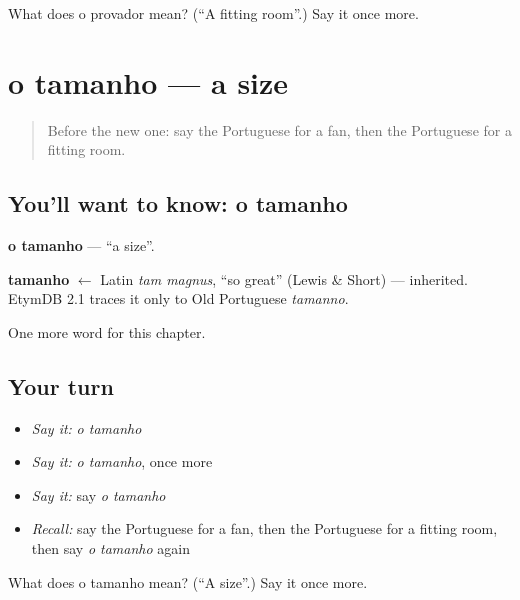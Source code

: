 \begin{tcolorbox}[breakable,colback=teal!4,colframe=teal!35!black,title={Before you move on}]
What does o provador mean? (\textquotedblleft{}A fitting room\textquotedblright{}.) Say it once more.
\end{tcolorbox}
\section[o tamanho]{o tamanho — a size}

\label{lesson:PT-C253-tamanho}



\begin{quote}
Before the new one: say the Portuguese for a fan, then the Portuguese for a fitting room.
\end{quote}

\subsection*{You'll want to know: o tamanho}
\textbf{o tamanho} — \textquotedblleft{}a size\textquotedblright{}.

\begin{cousinweb}
\textbf{tamanho} $\leftarrow$ Latin \emph{tam magnus}, \textquotedblleft{}so great\textquotedblright{} (Lewis \& Short) — inherited. EtymDB 2.1 traces it only to Old Portuguese \emph{tamanno}.
\end{cousinweb}

\begin{grammarlens}[title={What you've built}]
One more word for this chapter.
\end{grammarlens}

\subsection*{Your turn}
\begin{itemize}
\raggedright
  \item \emph{Say it:} \emph{o tamanho}
  \item \emph{Say it:} \emph{o tamanho}, once more
  \item \emph{Say it:} say \emph{o tamanho}
  \item \emph{Recall:} say the Portuguese for a fan, then the Portuguese for a fitting room, then say \emph{o tamanho} again
\end{itemize}

\begin{tcolorbox}[breakable,colback=teal!4,colframe=teal!35!black,title={Before you move on}]
What does o tamanho mean? (\textquotedblleft{}A size\textquotedblright{}.) Say it once more.
\end{tcolorbox}
